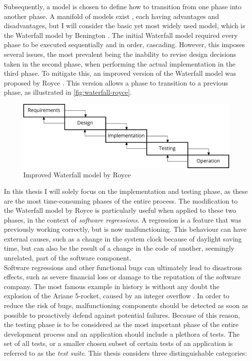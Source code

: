 \noindent Subsequently, a model is chosen to define how to transition from one phase into another phase. A manifold of models exist \cite{2010govardhan}, each having advantages and disadvantages, but I will consider the basic yet most widely used model, which is the Waterfall model by Benington \cite{united1956symposium}. The initial Waterfall model required every phase to be executed sequentially and in order, cascading. However, this imposes several issues, the most prevalent being the inability to revise design decisions taken in the second phase, when performing the actual implementation in the third phase. To mitigate this, an improved version of the Waterfall model was proposed by Royce \cite{Royce:1987:MDL:41765.41801}. This version allows a phase to transition to a previous phase, as illustrated in \autoref{fig:waterfall-royce}.

\begin{figure}[htbp!]
	\centering
	\includegraphics[width=\textwidth]{assets/sdlc.pdf}
	\caption{Improved Waterfall model by Royce}
	\label{fig:waterfall-royce}
\end{figure}

\noindent In this thesis I will solely focus on the implementation and testing phase, as these are the most time-consuming phases of the entire process. The modification to the Waterfall model by Royce is particularly useful when applied to these two phases, in the context of \emph{software regressions}. A regression \cite{10.1007/978-3-540-77966-7_18} is a feature that was previously working correctly, but is now malfunctioning. This behaviour can have external causes, such as a change in the system clock because of daylight saving time, but can also be the result of a change in the code of another, seemingly unrelated, part of the software component.\\

\noindent Software regressions and other functional bugs can ultimately lead to disastrous effects, such as severe financial loss or damage to the reputation of the software company. The most famous example in history is without any doubt the explosion of the Ariane 5-rocket, caused by an integer overflow \cite{581900}. In order to reduce the risk of bugs, malfunctioning components should be detected as soon as possible to proactively defend against potential failures. Because of this reason, the testing phase is to be considered as the most important phase of the entire development process and an application should include a plethora of tests. The set of all tests, or a smaller chosen subset of certain tests of an application is referred to as the \emph{test suite}. This thesis considers three distinguishable categories:

